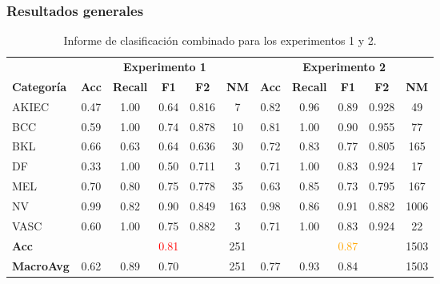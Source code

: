 \documentclass{beamer}
\begin{document}
\begin{frame}
  \frametitle{Resultados generales}

  \begin{table}
    \footnotesize %
    \setlength{\tabcolsep}{3pt} %
    \centering
    \caption{Informe de clasificación combinado para los experimentos 1 y 2.}
    \label{tab:classification_report_combined}
    \begin{tabular}{lcccccccccc}
    \hline
    & \multicolumn{5}{c}{\textbf{Experimento 1}} & \multicolumn{5}{c}{\textbf{Experimento 2}} \\
    \cline{2-10}
    \textbf{Categoría} & \textbf{Acc} & \textbf{Recall} & \textbf{F1} & \textbf{F2} & \textbf{NM} & \textbf{Acc} & \textbf{Recall} & \textbf{F1} & \textbf{F2} & \textbf{NM} \\
    \hline
    AKIEC & 0.47 & 1.00 & 0.64 & 0.816 & 7   & 0.82 & 0.96 & 0.89 & 0.928  & 49 \\
    BCC   & 0.59 & 1.00 & 0.74 & 0.878 & 10  & 0.81 & 1.00 & 0.90 &  0.955 & 77 \\
    BKL   & 0.66 & 0.63 & 0.64 & 0.636 & 30  & 0.72 & 0.83 & 0.77 & 0.805  & 165 \\
    DF    & 0.33 & 1.00 & 0.50 & 0.711 & 3   & 0.71 & 1.00 & 0.83 & 0.924  & 17 \\
    MEL   & 0.70 & 0.80 & 0.75 & 0.778 & 35  & 0.63 & 0.85 & 0.73 & 0.795  & 167 \\
    NV    & 0.99 & 0.82 & 0.90 & 0.849 & 163 & 0.98 & 0.86 & 0.91 & 0.882  & 1006 \\
    VASC  & 0.60 & 1.00 & 0.75 & 0.882 & 3   & 0.71 & 1.00 & 0.83 & 0.924  & 22 \\
    \hline
    \textbf{Acc} & & & \textcolor{red}{0.81} & & 251 & & & \textcolor{orange}{0.87} & & 1503 \\
    \textbf{MacroAvg} & 0.62 & 0.89 & 0.70 & & 251 & 0.77 & 0.93 & 0.84 & & 1503 \\
    \hline
    \end{tabular}
\end{table}

\end{frame}

\end{document}
